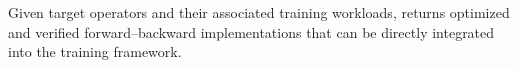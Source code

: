 Given target operators and their associated training workloads, \method returns optimized and verified forward--backward implementations that can be directly integrated into the training framework.



